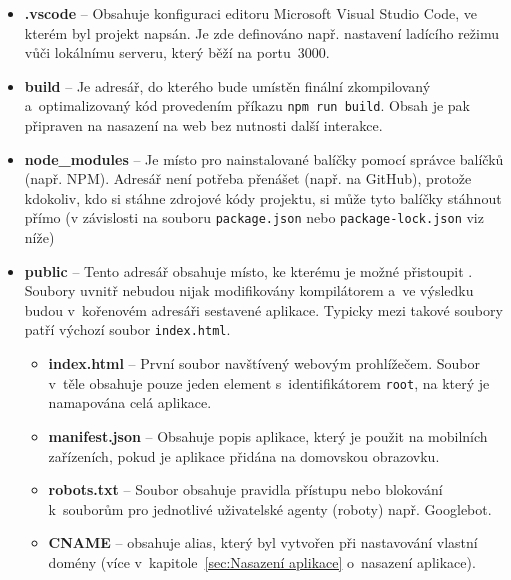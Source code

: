 \begin{itemize}
    \item \textbf{.vscode} -- Obsahuje konfiguraci editoru Microsoft Visual Studio Code, ve kterém byl projekt napsán. Je zde definováno např. nastavení ladícího režimu vůči lokálnímu serveru, který běží na portu~3000.
    \item \textbf{build} -- Je adresář, do kterého bude umístěn finální zkompilovaný a~optimalizovaný kód provedením příkazu \texttt{npm run build}. Obsah je pak připraven na nasazení na web bez nutnosti další interakce.
    \item \textbf{node\_modules} -- Je místo pro nainstalované balíčky pomocí správce balíčků (např. NPM). Adresář není potřeba přenášet (např. na GitHub), protože kdokoliv, kdo si stáhne zdrojové kódy projektu, si může tyto balíčky stáhnout přímo (v závislosti na souboru \texttt{package.json} nebo \texttt{package-lock.json} viz níže)
    \item \textbf{public} -- Tento adresář obsahuje místo, ke kterému je možné přistoupit . Soubory uvnitř nebudou nijak modifikovány kompilátorem a~ve výsledku budou v~kořenovém adresáři sestavené aplikace. Typicky mezi takové soubory patří výchozí soubor \texttt{index.html}.
        \begin{itemize}
            \item \textbf{index.html} -- První soubor navštívený webovým prohlížečem. Soubor v~těle obsahuje pouze jeden element s~identifikátorem \texttt{root}, na který je namapována celá aplikace.
            \item \textbf{manifest.json} -- Obsahuje popis aplikace, který je použit na mobilních zařízeních, pokud je aplikace přidána na domovskou obrazovku.
            \item \textbf{robots.txt} -- Soubor obsahuje pravidla přístupu nebo blokování k~souborům pro jednotlivé uživatelské agenty (roboty) např. Googlebot.
            \item \textbf{CNAME} --  obsahuje alias, který byl vytvořen při nastavování vlastní domény (více v~kapitole~\ref{sec:Nasazení aplikace} o~nasazení aplikace).
        \end{itemize}
        

\end{itemize}
